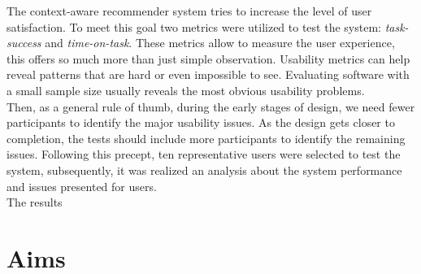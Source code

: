The context-aware recommender system tries to increase the 
level of user satisfaction.
To meet this goal two metrics were utilized to test the system:
\textit{task-success} and \textit{time-on-task}. These metrics allow
to measure the user experience, this offers so much more than just
simple observation. Usability metrics can help reveal patterns that
are hard or even impossible to see. Evaluating software with a small
sample size usually reveals the most obvious usability
problems\cite{albert2013measuring}.\\
Then, as a general rule of thumb, during the early stages of design,
we need fewer participants to identify the major usability issues. As
the design gets closer to completion, the tests should include more
participants to identify the remaining issues. Following this precept,
ten representative users were selected to test the system,
subsequently, it was realized an analysis about the system performance
and issues presented for users.\\
The results

%
%

\section{Aims}

